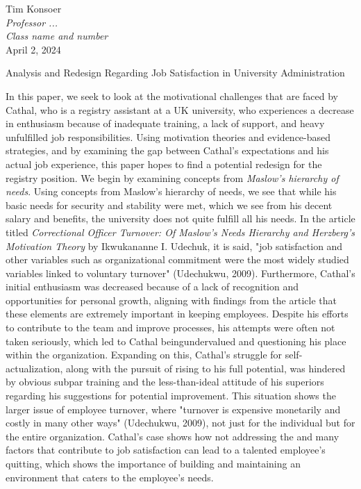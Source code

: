 \documentclass[12pt]{article}
\begin{document}
\begin{flushleft}

Tim Konsoer\\
\textit{Professor ...}\\
\textit{Class name and number}\\
April 2, 2024\\


\begin{center}
Analysis and Redesign Regarding Job Satisfaction in University Administration
\end{center}


\setlength{\parindent}{0.5in}
In this paper, we seek to look at the motivational challenges that are faced by Cathal, who is a registry assistant at a UK university, who experiences a decrease in enthusiasm because of inadequate training, a lack of support, and heavy unfulfilled job responsibilities. Using motivation theories and evidence-based strategies, and by examining the gap between Cathal's expectations and his actual job experience, this paper hopes to find a potential redesign for the registry position.
\bigbreak \noindent 
\hspace{\parindent} We begin by examining concepts from \textit{Maslow's hierarchy of needs}. Using concepts from Maslow's hierarchy of needs,  we see that while his basic needs for security and stability were met, which we see from his decent salary and benefits, the university does not quite fulfill all his needs. In the article titled \textit{Correctional Officer Turnover: Of Maslow's Needs Hierarchy and Herzberg's Motivation Theory} by Ikwukananne I. Udechuk, it is said, "job satisfaction and other variables such as organizational commitment were the most widely studied variables linked to voluntary turnover" (Udechukwu, 2009). Furthermore, Cathal's initial enthusiasm was decreased because of a lack of recognition and opportunities for personal growth, aligning with findings from the article that these elements are extremely important in keeping employees. Despite his efforts to contribute to the team and improve processes, his attempts were often not taken seriously, which led to Cathal beingundervalued and questioning his place within the organization.
\bigbreak \noindent 
\hspace{\parindent} Expanding on this, Cathal's struggle for self-actualization, along with the pursuit of rising to his full potential, was hindered by obvious subpar training and the less-than-ideal attitude of his superiors regarding his suggestions for potential improvement. This situation shows the larger issue of employee turnover, where "turnover is expensive monetarily and costly in many other ways" (Udechukwu, 2009), not just for the individual but for the entire organization. Cathal's case shows how not addressing the and many factors that contribute to job satisfaction can lead to a talented employee's quitting, which shows the importance of building and maintaining an environment that caters to the employee's needs.

\end{flushleft}
\end{document}
